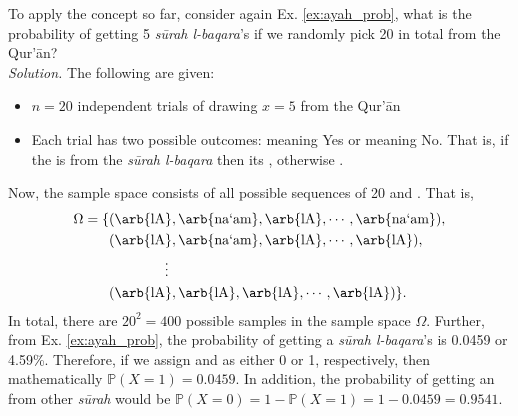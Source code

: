 \begin{exmpx}\label{ex:binom_manual}
To apply the concept so far, consider again Ex. \ref{ex:ayah_prob}, what is the probability of getting 5 \textit{s\=urah l-baqara}'s   if we randomly pick 20   in total from the Qur'\=an?\\
\textit{Solution.} The following are given:
\begin{itemize}
    \item $n=20$ independent trials of drawing $x=5$  from the Qur'\=an
    \item Each trial has two possible outcomes:   meaning Yes or   meaning No. That is, if the    is from the \textit{s\=urah l-baqara}  then its , otherwise .
\end{itemize}
Now, the sample space consists of all possible sequences of 20  and . That is,
\begin{align}
    \Omega=\{&
        (\text{\arb{lA}},\text{\arb{na`am}},\text{\arb{lA}},\cdots,\text{\arb{na`am}}),\\
        &(\text{\arb{lA}},\text{\arb{na`am}},\text{\arb{lA}},\cdots,\text{\arb{lA}}),\\
        &\qquad\qquad\vdots\\
        &(\text{\arb{lA}},\text{\arb{lA}},\text{\arb{lA}},\cdots,\text{\arb{lA}})\}.
\end{align}
In total, there are $20^2=400$ possible samples in the sample space $\Omega$. Further, from Ex. \ref{ex:ayah_prob}, the probability of getting a \textit{s\=urah l-baqara}'s   is 0.0459 or 4.59\%. Therefore, if we assign   and  as either 0 or 1, respectively, then mathematically $\mathbb{P}(X=1)=0.0459$. In addition, the probability of getting an   from other \textit{s\=urah}  would be $\mathbb{P}(X=0)=1-\mathbb{P}(X=1)=1-0.0459=0.9541$. 


\end{exmpx}
